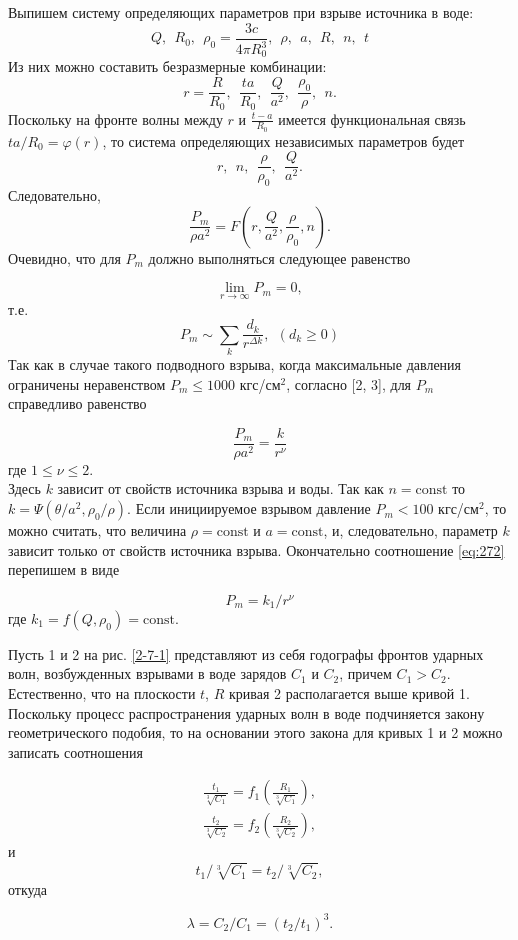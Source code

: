 \documentclass[specialist, subf, href, colorlinks=true, 14pt, final]{disser}
\theoremstyle{definition}
\newcommand{\const}{\text{const}}
\begin{document}
Выпишем систему определяющих параметров при взрыве источника в воде:
\[
  Q,\ \ R_{0},\ \ \rho_{0}=\frac{3c}{4\pi R_{0}^{3}},\ \ \rho,\ \ a,\ \ R,\ \ n,\ \ t
\]
Из них можно составить безразмерные комбинации:
\[
  r = \frac{R}{R_0},\ \ \frac{ta}{R_0},\ \ \frac{Q}{a^2},\ \ \frac{\rho_0}{\rho},\ \ n.
\]
Поскольку на фронте волны между $r$ и $\frac{t-a}{R_0}$ имеется функциональная связь $ta/R_{0} = \varphi(r)$, то система определяющих независимых параметров будет
\[
  r,\ \ n,\ \ \frac{\rho}{\rho_0},\ \ \frac{Q}{a^2}.
\]
Следовательно,
\[
  \frac{P_m}{\rho a^2} = F(r, \frac{Q}{a^2}, \frac{\rho}{\rho_0}, n).
\]
Очевидно, что для $P_m$ должно выполняться следующее равенство
\addtocounter{equation}{1}
\begin{equation}\label{eq:271}
  \lim\limits_{r\rightarrow\infty}P_{m} = 0,
  \tag{1}
\end{equation}
т.е.
\[
  P_{m} \sim \sum\limits_{k}\frac{d_k}{r^{\Delta k}},\ \ (d_{k} \geqslant 0)
\]
Так как в случае такого подводного взрыва, когда максимальные давления ограничены неравенством $P_{m} \leqslant 1000$ кгс/см$^2$, согласно [2, 3], для $P_m$ справедливо равенство
\addtocounter{equation}{1}
\begin{equation}\label{eq:272}
  \frac{P_m}{\rho a^2} = \frac{k}{r^\nu}
  \tag{2}
\end{equation}
где $1\leqslant\nu\leqslant 2$.\\
Здесь $k$ зависит от свойств источника взрыва и воды. Так как $n = \const$ то $k = \Psi(\theta / a^{2}, \rho_{0}/\rho)$. Если инициируемое взрывом давление $P_{m} < 100$ кгс/см$^2$, то можно считать, что величина $\rho = \const$ и $a = \const$, и, следовательно, параметр $k$ зависит только от свойств источника взрыва. Окончательно соотношение \eqref{eq:272} перепишем в виде
\addtocounter{equation}{1}
\begin{equation}\label{eq:273}
  P_{m} = k_{1} / r^{\nu}
  \tag{3}
\end{equation}
где $k_{1} = f(Q, \rho_{0}) = \const$.

Пусть 1 и 2 на рис. \ref{2-7-1} представляют из себя годографы фронтов ударных волн, возбужденных взрывами в воде зарядов $C_1$ и $C_2$, причем $C_{1} > C_{2}$. Естественно, что на плоскости $t$, $R$ кривая 2 располагается выше кривой 1. Поскольку процесс распространения ударных волн в воде подчиняется закону геометрического подобия, то на основании этого закона для кривых 1 и 2 можно записать соотношения
\addtocounter{equation}{1}
\begin{equation}\label{eq:274}
  \begin{aligned}
  \frac{t_1}{\sqrt[3]{C_1}} = f_{1}\left(\frac{R_1}{\sqrt[3]{C_1}}\right),\\
  \frac{t_2}{\sqrt[3]{C_2}} = f_{2}\left(\frac{R_2}{\sqrt[3]{C_2}}\right),
  \end{aligned}
  \tag{4}
\end{equation}
и
\[
  t_{1} / \sqrt[3]{C_1} = t_{2} / \sqrt[3]{C_2},
\]
откуда
\addtocounter{equation}{1}
\begin{equation}\label{eq:275}
  \lambda = C_{2}/C_{1} = (t_{2}/t_{1})^{3}.
  \tag{5}
\end{equation}
\end{document}
